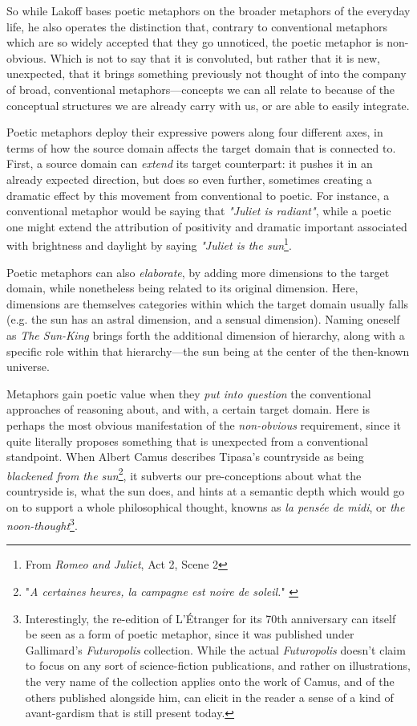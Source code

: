 So while Lakoff bases poetic metaphors on the broader metaphors of the everyday life, he also operates the distinction that, contrary to conventional metaphors which are so widely accepted that they go unnoticed, the poetic metaphor is non-obvious. Which is not to say that it is convoluted, but rather that it is new, unexpected, that it brings something previously not thought of into the company of broad, conventional metaphors—concepts we can all relate to because of the conceptual structures we are already carry with us, or are able to easily integrate.

Poetic metaphors deploy their expressive powers along four different axes, in terms of how the source domain affects the target domain that is connected to. First, a source domain can \emph{extend} its target counterpart: it pushes it in an already expected direction, but does so even further, sometimes creating a dramatic effect by this movement from conventional to poetic. For instance, a conventional metaphor would be saying that \emph{"Juliet is radiant"}, while a poetic one might extend the attribution of positivity and dramatic important associated with brightness and daylight by saying \emph{"Juliet is the sun}\footnote{From \emph{Romeo and Juliet}, Act 2, Scene 2}.

Poetic metaphors can also \emph{elaborate}, by adding more dimensions to the target domain, while nonetheless being related to its original dimension. Here, dimensions are themselves categories within which the target domain usually falls (e.g. the sun has an astral dimension, and a sensual dimension). Naming oneself as \emph{The Sun-King} brings forth the additional dimension of hierarchy, along with a specific role within that hierarchy—the sun being at the center of the then-known universe.

Metaphors gain poetic value when they \emph{put into question} the conventional approaches of reasoning about, and with, a certain target domain. Here is perhaps the most obvious manifestation of the \emph{non-obvious} requirement, since it quite literally proposes something that is unexpected from a conventional standpoint. When Albert Camus describes Tipasa's countryside as being \emph{blackened from the sun}\footnote{"\emph{A certaines heures, la campagne est noire de soleil.}" \citep{camus_noces_1972}}, it subverts our pre-conceptions about what the countryside is, what the sun does, and hints at a semantic depth which would go on to support a whole philosophical thought, knowns as \emph{la pensée de midi}, or \emph{the noon-thought}\footnote{Interestingly, the re-edition of L'Étranger for its 70th anniversary can itself be seen as a form of poetic metaphor, since it was published under Gallimard's \emph{Futuropolis} collection. While the actual \emph{Futuropolis} doesn't claim to focus on any sort of science-fiction publications, and rather on illustrations, the very name of the collection applies onto the work of Camus, and of the others published alongside him, can elicit in the reader a sense of a kind of avant-gardism that is still present today.}.

